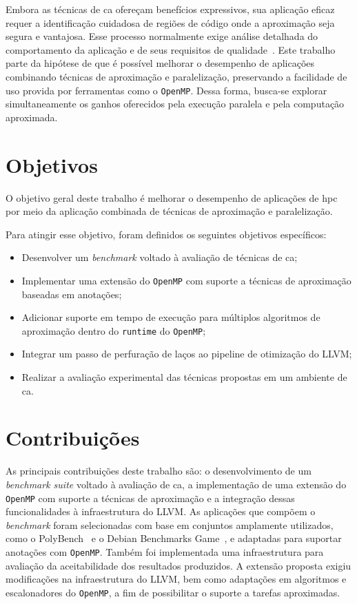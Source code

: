 Embora as técnicas de \gls{ca} ofereçam benefícios expressivos, sua aplicação eficaz requer a identificação cuidadosa de regiões de código onde a aproximação seja segura e vantajosa. Esse processo normalmente exige análise detalhada do comportamento da aplicação e de seus requisitos de qualidade~\cite{sampson2015,reis2021}. Este trabalho parte da hipótese de que é possível melhorar o desempenho de aplicações combinando técnicas de aproximação e paralelização, preservando a facilidade de uso provida por ferramentas como o \texttt{OpenMP}. Dessa forma, busca-se explorar simultaneamente os ganhos oferecidos pela execução paralela e pela computação aproximada.

\section{Objetivos}\label{cap:objetivos}

O objetivo geral deste trabalho é melhorar o desempenho de aplicações de \gls{hpc} por meio da aplicação combinada de técnicas de aproximação e paralelização.

Para atingir esse objetivo, foram definidos os seguintes objetivos específicos:
\begin{itemize}
    \item Desenvolver um \textit{benchmark} voltado à avaliação de técnicas de \gls{ca};
    \item Implementar uma extensão do \texttt{OpenMP} com suporte a técnicas de aproximação baseadas em anotações;
    \item Adicionar suporte em tempo de execução para múltiplos algoritmos de aproximação dentro do \texttt{runtime} do \texttt{OpenMP};
    \item Integrar um passo de perfuração de laços ao pipeline de otimização do LLVM;
    \item Realizar a avaliação experimental das técnicas propostas em um ambiente de \gls{ca}.
\end{itemize}

\section{Contribuições}\label{cap:contribuicoes}

As principais contribuições deste trabalho são: o desenvolvimento de um \textit{benchmark suite} voltado à avaliação de \gls{ca}, a implementação de uma extensão do \texttt{OpenMP} com suporte a técnicas de aproximação e a integração dessas funcionalidades à infraestrutura do LLVM. As aplicações que compõem o \textit{benchmark} foram selecionadas com base em conjuntos amplamente utilizados, como o PolyBench~\cite{polybench} e o Debian Benchmarks Game~\cite{debianBenchmarksGame}, e adaptadas para suportar anotações com \texttt{OpenMP}. Também foi implementada uma infraestrutura para avaliação da aceitabilidade dos resultados produzidos. A extensão proposta exigiu modificações na infraestrutura do LLVM, bem como adaptações em algoritmos e escalonadores do \texttt{OpenMP}, a fim de possibilitar o suporte a tarefas aproximadas.


